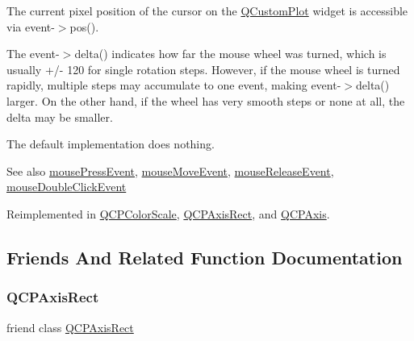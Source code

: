 The current pixel position of the cursor on the \mbox{\hyperlink{class_q_custom_plot}{Q\+Custom\+Plot}} widget is accessible via {\ttfamily event-\/$>$pos()}.

The {\ttfamily event-\/$>$delta()} indicates how far the mouse wheel was turned, which is usually +/-\/ 120 for single rotation steps. However, if the mouse wheel is turned rapidly, multiple steps may accumulate to one event, making {\ttfamily event-\/$>$delta()} larger. On the other hand, if the wheel has very smooth steps or none at all, the delta may be smaller.

The default implementation does nothing.

\begin{DoxySeeAlso}{See also}
\mbox{\hyperlink{class_q_c_p_layerable_af6567604818db90f4fd52822f8bc8376}{mouse\+Press\+Event}}, \mbox{\hyperlink{class_q_c_p_layerable_a9eee1ba47fd69be111059ca3881933e4}{mouse\+Move\+Event}}, \mbox{\hyperlink{class_q_c_p_layerable_aa0d79b005686f668622bbe66ac03ba2c}{mouse\+Release\+Event}}, \mbox{\hyperlink{class_q_c_p_layerable_a4171e2e823aca242dd0279f00ed2de81}{mouse\+Double\+Click\+Event}} 
\end{DoxySeeAlso}


Reimplemented in \mbox{\hyperlink{class_q_c_p_color_scale_a63cf19be184f6670c9495ad3a9a1baeb}{Q\+C\+P\+Color\+Scale}}, \mbox{\hyperlink{class_q_c_p_axis_rect_a93eeaa0c127d6d6fe8171b2455080262}{Q\+C\+P\+Axis\+Rect}}, and \mbox{\hyperlink{class_q_c_p_axis_aa850f195d7cc470c53809d0fff5e444d}{Q\+C\+P\+Axis}}.



\subsection{Friends And Related Function Documentation}
\mbox{\label{class_q_c_p_layerable_acbf20ecb140f66c5fd1bc64ae0762990}} 
\subsubsection{\texorpdfstring{QCPAxisRect}{QCPAxisRect}}
{\footnotesize\ttfamily friend class \mbox{\hyperlink{class_q_c_p_axis_rect}{Q\+C\+P\+Axis\+Rect}}\hspace{0.3cm}{\ttfamily [friend]}}

\mbox{\label{class_q_c_p_layerable_a5dbf96bf7664c1b6fce49063eeea6eef}} 
